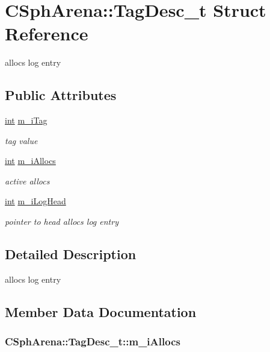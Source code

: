 \hypertarget{structCSphArena_1_1TagDesc__t}{\section{C\-Sph\-Arena\-:\-:Tag\-Desc\-\_\-t Struct Reference}
\label{structCSphArena_1_1TagDesc__t}
}


allocs log entry  


\subsection*{Public Attributes}
\begin{DoxyCompactItemize}
\item 
\hyperlink{sphinxexpr_8cpp_a4a26e8f9cb8b736e0c4cbf4d16de985e}{int} \hyperlink{structCSphArena_1_1TagDesc__t_a710b012c4284e49461b746b847881358}{m\-\_\-i\-Tag}
\begin{DoxyCompactList}\small\item\em tag value \end{DoxyCompactList}\item 
\hyperlink{sphinxexpr_8cpp_a4a26e8f9cb8b736e0c4cbf4d16de985e}{int} \hyperlink{structCSphArena_1_1TagDesc__t_a7d323d58c94bd045762ed0642d2ef9e4}{m\-\_\-i\-Allocs}
\begin{DoxyCompactList}\small\item\em active allocs \end{DoxyCompactList}\item 
\hyperlink{sphinxexpr_8cpp_a4a26e8f9cb8b736e0c4cbf4d16de985e}{int} \hyperlink{structCSphArena_1_1TagDesc__t_ac53ca37b13b3521ce93dfd5378d90e3e}{m\-\_\-i\-Log\-Head}
\begin{DoxyCompactList}\small\item\em pointer to head allocs log entry \end{DoxyCompactList}\end{DoxyCompactItemize}


\subsection{Detailed Description}
allocs log entry 

\subsection{Member Data Documentation}
\hypertarget{structCSphArena_1_1TagDesc__t_a7d323d58c94bd045762ed0642d2ef9e4}{
\subsubsection[{m\-\_\-i\-Allocs}]{ C\-Sph\-Arena\-::\-Tag\-Desc\-\_\-t\-::m\-\_\-i\-Allocs}}\label{structCSphArena_1_1TagDesc__t_a7d323d58c94bd045762ed0642d2ef9e4}


